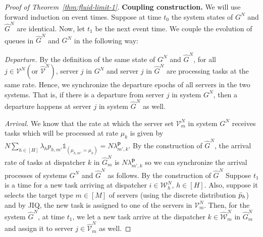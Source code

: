 \documentclass[11pt, reqno]{article}
\numberwithin{equation}{section}
\numberwithin{theorem}{section}
\begin{document}
\begin{proof}[Proof of Theorem~\ref{thm:fluid-limit-1}]
\noindent
\textbf{Coupling construction.} 
We will use forward induction on event times.
Suppose at time $t_0$ the system states of $G^N$ and $\hat{G}^N$ are identical.
Now, let $t_1$ be the next event time.
We couple the evolution of queues in $\hat{G}^N$ and $G^N$ in the following way:
\vspace{.2cm}

\noindent
\textit{Departure.} By the definition of the same state of $G^N$ and $\hat{G}^N$, for all $j\in\mathcal{V}^N(\text{or }\hat{\mathcal{V}}^N)$, server $j$ in $G^N$ and server $j$ in $\hat{G}^N$ are processing tasks at the same rate. Hence, we synchronize the departure epochs of all servers in the two systems. That is, if there is a departure from server $j$ in system $G^N$, then a departure happens at server $j$ in system $\hat{G}^N$ as well.
\vspace{.2cm}

\noindent
\textit{Arrival.} We know that the rate at which the server set $\mathcal{V}^N_m$ in system $G^N$ receives tasks which will be processed at rate $\mu_k$ is given by $N\sum_{h\in[H]}\lambda_hp_{h,m'}\mathds{1}_{(\mu_{h,m'}=\mu_k)}=N\lambda^{\mathbf{p}}_{m',k}$. By the construction of $\hat{G}^N$, the arrival rate of tasks at dispatcher $k$ in $\hat{G}^N_{m}$ is $N\lambda^{\mathbf{p}}_{m',k}$ so we can synchronize the arrival processes of systems $G^N$ and $\hat{G}^N$ as follows.  By the construction of $\hat{G}^N$ Suppose $t_1$ is a time for a new task arriving at dispatcher $i\in\mathcal{W}^N_h$, $h\in[H]$. Also, suppose it selects the target type $m\in[M]$ of servers (using the discrete distribution $\Bar{p}_h$) and by JIQ, the new task is assigned to one of the servers in $\mathcal{V}^N_m$. Then, for the system $\hat{G}^N$, at time $t_1$, we let  a new task arrive at the dispatcher $k\in\hat{\mathcal{W}}^N_m$ in $\hat{G}^N_m$ and assign it to server $j\in\hat{\mathcal{V}}^N_m$ as well.
\vspace{.2cm}


\end{proof}
\end{document}
